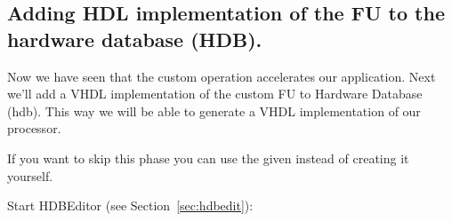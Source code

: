 \documentclass[twoside]{tceusermanual}
\begin{document}
\subsection{Adding HDL implementation of the FU to the hardware database
(HDB).}
\label{par:AddToHDB}

Now we have seen that the custom operation accelerates our application. Next
we'll add a VHDL implementation of the custom FU to Hardware Database (hdb).
This way we will be able to generate a VHDL implementation of our processor.

If you want to skip this phase you can use the given 
instead of creating it yourself.

Start HDBEditor (see Section~\ref{sec:hdbedit}):

\end{document}
